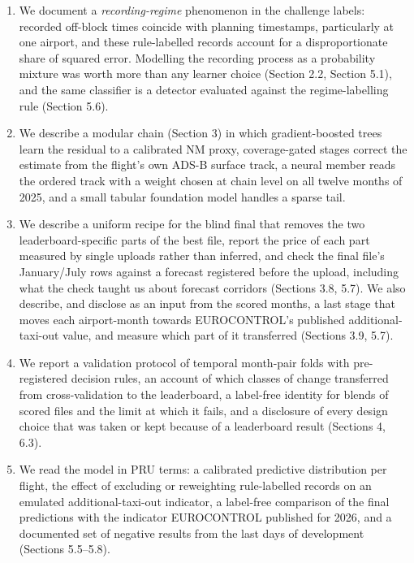\documentclass[
  manuscript=article,  %
  layout=preprint,     %
  year=2026,
  volume=4,
]{extra/joas}
\providecommand{\tightlist}{\setlength{\itemsep}{0pt}\setlength{\parskip}{0pt}}
\begin{document}
\begin{enumerate}
\def\labelenumi{\arabic{enumi}.}
\tightlist
\item
  We document a \emph{recording-regime} phenomenon in the challenge labels: recorded off-block times coincide with planning timestamps, particularly at one airport, and these rule-labelled records account for a disproportionate share of squared error. Modelling the recording process as a probability mixture was worth more than any learner choice (Section 2.2, Section 5.1), and the same classifier is a detector evaluated against the regime-labelling rule (Section 5.6).
\item
  We describe a modular chain (Section 3) in which gradient-boosted trees learn the residual to a calibrated NM proxy, coverage-gated stages correct the estimate from the flight's own ADS-B surface track, a neural member reads the ordered track with a weight chosen at chain level on all twelve months of 2025, and a small tabular foundation model handles a sparse tail.
\item
  We describe a uniform recipe for the blind final that removes the two leaderboard-specific parts of the best file, report the price of each part measured by single uploads rather than inferred, and check the final file's January/July rows against a forecast registered before the upload, including what the check taught us about forecast corridors (Sections 3.8, 5.7). We also describe, and disclose as an input from the scored months, a last stage that moves each airport-month towards EUROCONTROL's published additional-taxi-out value, and measure which part of it transferred (Sections 3.9, 5.7).
\item
  We report a validation protocol of temporal month-pair folds with pre-registered decision rules, an account of which classes of change transferred from cross-validation to the leaderboard, a label-free identity for blends of scored files and the limit at which it fails, and a disclosure of every design choice that was taken or kept because of a leaderboard result (Sections 4, 6.3).
\item
  We read the model in PRU terms: a calibrated predictive distribution per flight, the effect of excluding or reweighting rule-labelled records on an emulated additional-taxi-out indicator, a label-free comparison of the final predictions with the indicator EUROCONTROL published for 2026, and a documented set of negative results from the last days of development (Sections 5.5--5.8).
\end{enumerate}
\end{document}
